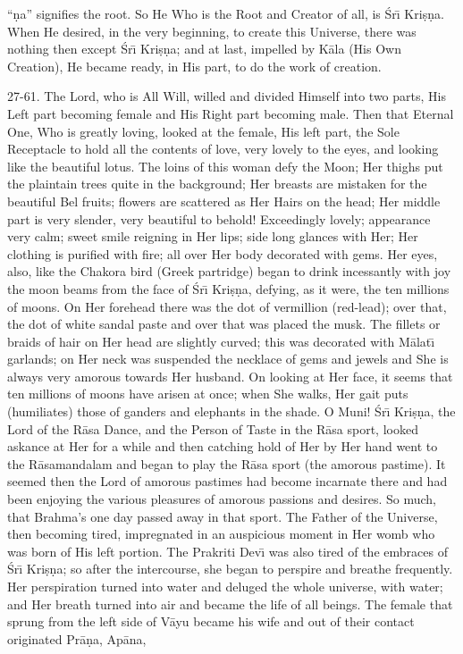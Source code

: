 ``\d{n}a'' signifies the root. So He Who is the Root and Creator of all, is \'Sr\={\i} Kri\d{s}\d{n}a. When He desired, in the very beginning, to create this Universe, there was nothing then except \'Sr\={\i} Kri\d{s}\d{n}a; and at last, impelled by K\=ala (His Own Creation), He became ready, in His part, to do the work of creation.

27-61. The Lord, who is All Will, willed and divided Himself into two parts, His Left part becoming female and His Right part becoming male. Then that Eternal One, Who is greatly loving, looked at the female, His left part, the Sole Receptacle to hold all the contents of love, very lovely to the eyes, and looking like the beautiful lotus. The loins of this woman defy the Moon; Her thighs put the plaintain trees quite in the background; Her breasts are mistaken for the beautiful Bel fruits; flowers are scattered as Her Hairs on the head; Her middle part is very slender, very beautiful to behold! Exceedingly lovely; appearance very calm; sweet smile reigning in Her lips; side long glances with Her; Her clothing is purified with fire; all over Her body decorated with gems. Her eyes, also, like the Chakora bird (Greek partridge) began to drink incessantly with joy the moon beams from the face of \'Sr\={\i} Kri\d{s}\d{n}a, defying, as it were, the ten millions of moons. On Her forehead there was the dot of vermillion (red-lead); over that, the dot of white sandal paste and over that was placed the musk. The fillets or braids of hair on Her head are slightly curved; this was decorated with M\=alat\={\i} garlands; on Her neck was suspended the necklace of gems and jewels and She is always very amorous towards Her husband. On looking at Her face, it seems that ten millions of moons have arisen at once; when She walks, Her gait puts (humiliates) those of ganders and elephants in the shade. O Muni! \'Sr\={\i} Kri\d{s}\d{n}a, the Lord of the R\=asa Dance, and the Person of Taste in the R\=asa sport, looked askance at Her for a while and then catching hold of Her by Her hand went to the R\=asamandalam and began to play the R\=asa sport (the amorous pastime). It seemed then the Lord of amorous pastimes had become incarnate there and had been enjoying the various pleasures of amorous passions and desires. So much, that Brahma's one day passed away in that sport. The Father of the Universe, then becoming tired, impregnated in an auspicious moment in Her womb who was born of His left portion. The Prakriti Dev\={\i} was also tired of the embraces of \'Sr\={\i} Kri\d{s}\d{n}a; so after the intercourse, she began to perspire and breathe frequently. Her perspiration turned into water and deluged the whole universe, with water; and Her breath turned into air and became the life of all beings. The female that sprung from the left side of V\=ayu became his wife and out of their contact originated Pr\=a\d{n}a, Ap\=ana,

